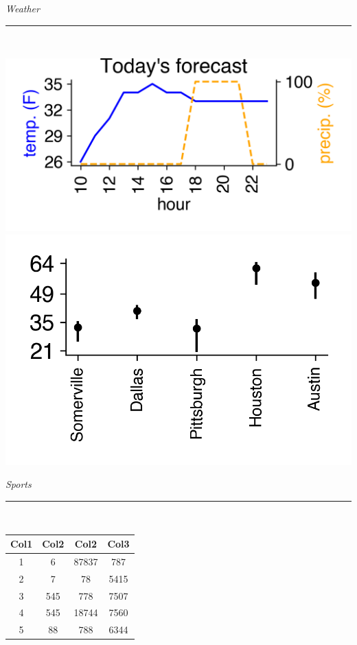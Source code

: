 \documentclass{article}
\date{\today}
\renewcommand\headline[1]{\begin{center} {\huge \textsl{ #1}}\\ %
			\rule[5pt]{0.8\hsize}{0.5pt}\\ \end{center}}
\begin{document}
\maketitle

\begin{multicols}{3}

\headline{Weather}
\center\includegraphics[width=\linewidth]{images/weather-forecast.png}
\noindent\center\includegraphics[width=0.75\linewidth]{images/weather-ranges.png}

\headline{Sports}
\begin{center}
\begin{tabular}{|c c c c|}
 \hline
 Col1 & Col2 & Col2 & Col3 \\
 \hline\hline
 1 & 6 & 87837 & 787 \\ 
 \hline
 2 & 7 & 78 & 5415 \\
 \hline
 3 & 545 & 778 & 7507 \\
 \hline
 4 & 545 & 18744 & 7560 \\
 \hline
 5 & 88 & 788 & 6344 \\
 \hline
\end{tabular}
\end{center}


\end{multicols}
\end{document}
